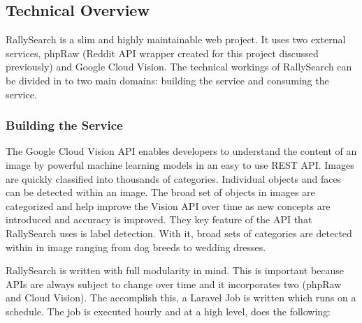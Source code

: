 \documentclass[msc,oneside]{ubcthesis}%
\begin{document}
\subsection{Technical Overview}
RallySearch is a slim and highly maintainable web project. It uses two external services, phpRaw (Reddit API wrapper created for this project discussed previously) and Google Cloud Vision. The technical workings of RallySearch can be divided in to two main domains: building the service and consuming the service.
\subsubsection{Building the Service}
The Google Cloud Vision API enables developers to understand the content of an image by powerful machine learning models in an easy to use REST API. Images are quickly classified into thousands of categories. Individual objects and faces can be detected within an image. The broad set of objects in images are categorized and help improve the Vision API over time as new concepts are introduced and accuracy is improved. They key feature of the API that RallySearch uses is label detection. With it, broad sets of categories are detected within in image ranging from dog breeds to wedding dresses.
\par
RallySearch is written with full modularity in mind. This is important because APIs are always subject to change over time and it incorporates two (phpRaw and Cloud Vision). The accomplish this, a Laravel Job is written which runs on a schedule. The job is executed hourly and at a high level, does the following:
\end{document}
